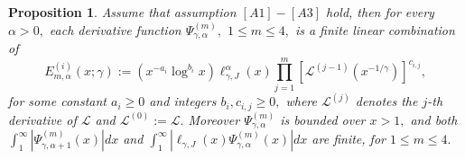 \documentclass[12pt,reqno,openbib,runningheads,a4paper,portrait]{amsart}%
\newtheorem{proposition}{Proposition}[section]
\begin{document}
\begin{proposition}
\textbf{\label{prop2}}Assume that assumption $\left[  A1\right]  -\left[
A3\right]  $ hold, then for every $\alpha>0,$ each derivative function
$\Psi_{\gamma,\alpha}^{\left(  m\right)  },$ $1\leq m\leq4,$ is a finite
linear combination of
\begin{equation}
E_{m,\alpha}^{\left(  i\right)  }\left(  x;\gamma\right)  :=\left(  x^{-a_{i}%
}\log^{b_{i}}x\right)  \ell_{\gamma,J}^{\alpha}\left(  x\right)
{\textstyle\prod_{j=1}^{m}}
\left[  \mathcal{L}^{\left(  j-1\right)  }\left(  x^{-1/\gamma}\right)
\right]  ^{c_{i,j}}, \label{lc}%
\end{equation}
for some constant $a_{i}\geq0$ and integers $b_{i},c_{i,j}\geq0,$ where
$\mathcal{L}^{\left(  j\right)  }$ denotes the $j$-th derivative of
$\mathcal{L} $ and $\mathcal{L}^{\left(  0\right)  }:=\mathcal{L}.$ Moreover
$\Psi_{\gamma,\alpha}^{\left(  m\right)  }$ is bounded over $x>1,$ and both
$\int_{1}^{\infty}\left\vert \Psi_{\gamma,\alpha+1}^{\left(  m\right)
}\left(  x\right)  \right\vert dx$ and $\int_{1}^{\infty}\left\vert
\ell_{\gamma,J}\left(  x\right)  \Psi_{\gamma,\alpha}^{\left(  m\right)
}\left(  x\right)  \right\vert dx$ are finite, for $1\leq m\leq4.$
\end{proposition}
\end{document}
